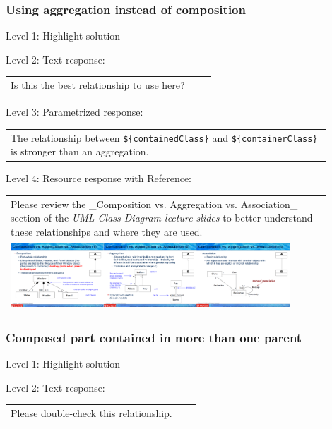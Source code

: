 \subsubsection{Using aggregation instead of composition}

\noindent Level 1: Highlight solution \medskip

\noindent Level 2: Text response: \medskip

\begin{tabular}{|p{0.9\linewidth}}
Is this the best relationship to use here?
\end{tabular} \medskip

\noindent Level 3: Parametrized response: \medskip

\begin{tabular}{|p{0.9\linewidth}}
The relationship between \verb|${containedClass}| and \verb|${containerClass}| is stronger than an aggregation.
\end{tabular} \medskip

\noindent Level 4: Resource response with Reference: \medskip

\begin{tabular}{|p{0.9\linewidth}}
Please review the _Composition vs. Aggregation vs. Association_ section of 
the \textit{UML Class Diagram lecture slides} to 
better understand these relationships and where they are used.

\\
\includegraphics[width=0.9\textwidth]{images/composition_aggregation_association.png}
\end{tabular} \medskip


\subsubsection{Composed part contained in more than one parent}

\noindent Level 1: Highlight solution \medskip

\noindent Level 2: Text response: \medskip

\begin{tabular}{|p{0.9\linewidth}}
Please double-check this relationship.
\end{tabular} \medskip

